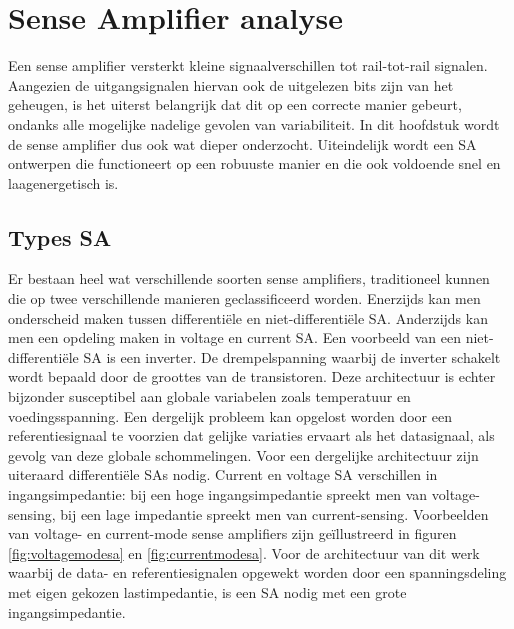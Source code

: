 \chapter{Sense Amplifier analyse}
\label{sensamp}
Een sense amplifier versterkt kleine signaalverschillen tot rail-tot-rail signalen. Aangezien de uitgangsignalen hiervan ook de uitgelezen bits zijn van het geheugen, is het uiterst belangrijk dat dit op een correcte manier gebeurt, ondanks alle mogelijke nadelige gevolen van variabiliteit.
In dit hoofdstuk wordt de sense amplifier dus ook wat dieper onderzocht. Uiteindelijk wordt een SA ontwerpen die functioneert op een robuuste manier en die ook voldoende snel en laagenergetisch is.

\section{Types SA}
Er bestaan heel wat verschillende soorten sense amplifiers, traditioneel kunnen die op twee verschillende manieren geclassificeerd worden. Enerzijds kan men onderscheid maken tussen differentiële en niet-differentiële SA. Anderzijds kan men een opdeling maken in voltage en current SA. Een voorbeeld van een niet-differentiële SA is een inverter. De drempelspanning waarbij de inverter schakelt wordt bepaald door de groottes van de transistoren. Deze architectuur is echter bijzonder susceptibel aan globale variabelen zoals temperatuur en voedingsspanning. Een dergelijk probleem kan opgelost worden door een referentiesignaal te voorzien dat gelijke variaties ervaart als het datasignaal, als gevolg van deze globale schommelingen. Voor een dergelijke architectuur zijn uiteraard differentiële SAs nodig. Current en voltage SA verschillen in ingangsimpedantie: bij een hoge ingangsimpedantie spreekt men van voltage-sensing, bij een lage impedantie spreekt men van current-sensing. Voorbeelden van voltage- en current-mode sense amplifiers zijn geïllustreerd in figuren \ref{fig:voltagemodesa} en \ref{fig:currentmodesa}. Voor de architectuur van dit werk waarbij de data- en referentiesignalen opgewekt worden door een spanningsdeling met eigen gekozen lastimpedantie, is een SA nodig met een grote ingangsimpedantie.

